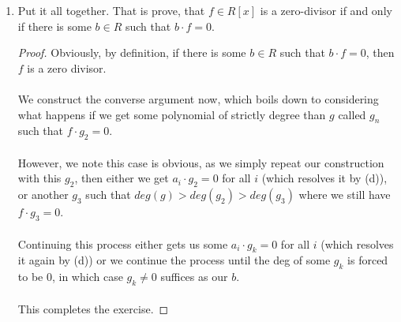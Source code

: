 \documentclass[12pt]{article}
\newenvironment{ex}[2][Exercise]{\begin{trivlist}
\item[\hskip \labelsep {\bfseries #1}\hskip \labelsep {\bfseries #2.}]}{\end{trivlist}}
\begin{document}
\begin{ex}{4}
\begin{enumerate}[label=(\alph*)]
\begin{proof}
        \end{proof}
        \item Put it all together. That is prove, that $f \in R[x]$ is a zero-divisor if and only if there is some $b \in R$ such that $b \cdot f = 0$.
        \begin{proof}
            Obviously, by definition, if there is some $b \in R$ such that $b \cdot f = 0$, then $f$ is a zero divisor. \\ \\
            We construct the converse argument now, which boils down to considering what happens if we get some polynomial of strictly degree than $g$ called $g_n$ such that $f \cdot g_2 = 0$. 
            \\ \\ However, we note this case is obvious, as we simply repeat our construction with this $g_2$, then either we get $a_i \cdot g_2 = 0$ for all $i$ (which resolves it by (d)), or another $g_3$ such that $deg(g) > deg(g_2) > deg(g_3)$ where we still have $f \cdot g_3 = 0$. \\ \\
            Continuing this process either gets us some $a_i \cdot g_k = 0$ for all $i$ (which resolves it again by (d)) or we continue the process until the deg of some $g_k$ is forced to be $0$, in which case $g_k \neq 0$ suffices as our $b$. \\ \\
            This completes the exercise.
        \end{proof}
    \end{enumerate}
\end{ex}
\end{document}
